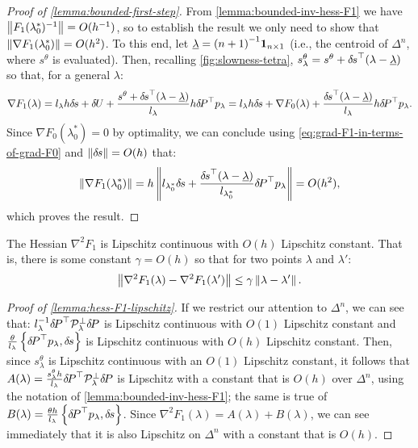 \documentclass[eikonal.tex]{subfiles}
\begin{document}
\begin{proof}[Proof of \cref{lemma:bounded-first-step}]
  From \cref{lemma:bounded-inv-hess-F1} we have
  $\left\|F_1(\lambda_0^*)^{-1}\right\| = O(h^{-1})$, so to establish the
  result we only need to show that
  $\left\|\nabla F_1(\lambda_0^*)\right\| = O(h^2)$. To this end, let
  $\underline{\lambda} = {(n + 1)}^{-1} \boldsymbol{1}_{n \times 1}$ (i.e., the
  centroid of $\Delta^n$, where $s^\theta$ is evaluated). Then,
  recalling \cref{fig:slowness-tetra},
  $s^\theta_\lambda = s^\theta + {\delta \hspace{-0.1em} s}^\top (\lambda -
  \underline{\lambda})$ so that, for a general $\lambda$:
  \begin{equation}
    \label{eq:grad-F1-in-terms-of-grad-F0}
    \nabla F_1(\lambda) = l_\lambda h \dels + \delU + \frac{s^\theta + \dels^\top (\lambda - \underline{\lambda})}{l_\lambda} h \delP^\top p_\lambda = l_\lambda h \dels + \nabla F_0(\lambda) + \frac{\dels^\top {(\lambda - \underline{\lambda})}}{l_\lambda} h \delP^\top p_\lambda.
  \end{equation}
  Since $\nabla F_0(\lambda_0^*) = 0$ by optimality, we can conclude
  using \cref{eq:grad-F1-in-terms-of-grad-F0} and
  $\left\|{\delta \hspace{-0.1em} s}\right\| = O(h)$ that:
  \begin{equation}
    \left\|\nabla F_1(\lambda_0^*)\right\| = h \left\|l_{\lambda_0^*} {\delta \hspace{-0.1em} s} + \frac{{\delta \hspace{-0.1em} s}^\top {(\lambda - \underline{\lambda})}}{l_{\lambda_0^*}} {\delta \hspace{-0.14em} P}^\top p_\lambda\right\| = O(h^2),
  \end{equation}
  which proves the result.
\end{proof}

\begin{lemma}\label{lemma:hess-F1-lipschitz}
  The Hessian $\nabla^2 F_1$ is Lipschitz continuous with $O(h)$
  Lipschitz constant. That is, there is some constant $\gamma = O(h)$
  so that for two points $\lambda$ and $\lambda'$:
  \begin{align*}
    \left\|\nabla^2 F_1(\lambda) - \nabla^2 F_1(\lambda')\right\| \leq \gamma \left\|\lambda - \lambda'\right\|.
  \end{align*}
\end{lemma}

\begin{proof}[Proof of \cref{lemma:hess-F1-lipschitz}]
  If we restrict our attention to $\Delta^n$, we can see that:
  $l_\lambda^{-1} {\delta \hspace{-0.14em} P}^\top \mathcal{P}_\lambda^\perp {\delta \hspace{-0.14em} P}$ is
  Lipschitz continuous with $O(1)$ Lipschitz constant and
  $\tfrac{\theta}{l_\lambda} \left\{{\delta \hspace{-0.14em} P}^\top p_\lambda, {\delta \hspace{-0.1em} s}\right\}$ is
  Lipschitz continuous with $O(h)$ Lipschitz constant. Then, since
  $s^\theta_\lambda$ is Lipschitz continuous with an $O(1)$ Lipschitz
  constant, it follows that
  $A(\lambda) = \tfrac{s^\theta_\lambda h}{l_\lambda} {\delta \hspace{-0.14em} P}^\top
  \mathcal{P}^\perp_\lambda {\delta \hspace{-0.14em} P}$ is Lipschitz with a constant that
  is $O(h)$ over $\Delta^n$, using the notation of
  \cref{lemma:bounded-inv-hess-F1}; the same is true of
  $B(\lambda) = \tfrac{\theta h}{l_\lambda} \left\{{\delta \hspace{-0.14em} P}^\top
    p_\lambda, {\delta \hspace{-0.1em} s}\right\}$. Since
  $\nabla^2 F_1(\lambda) = A(\lambda) + B(\lambda)$, we can see
  immediately that it is also Lipschitz on $\Delta^n$ with a constant
  that is $O(h)$.
\end{proof}
\end{document}
